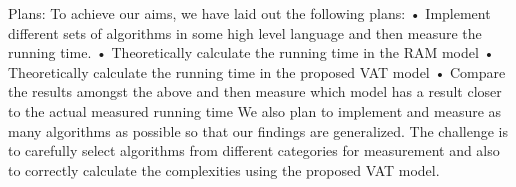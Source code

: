 Plans:
To achieve our aims, we have laid out the following plans:
•  Implement different sets of algorithms in some high level language and then measure the running time.
•	Theoretically calculate the running time in the RAM model
•	Theoretically calculate the running time in the proposed VAT model
•	Compare the results amongst the above and then measure which model has a result closer to the actual measured running time
We also plan to implement and measure as many algorithms as possible so that our findings are generalized. The challenge is to carefully select algorithms from different categories for measurement and also to correctly calculate the complexities using the proposed VAT model.
